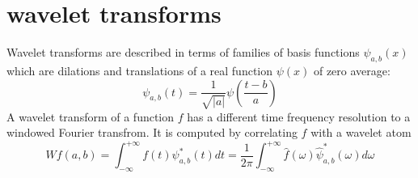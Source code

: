 \section{wavelet transforms}
Wavelet transforms are described in terms of families of basis functions $\psi_{a,b}(x)$ which are dilations and translations of a real function $\psi(x)$ of zero average:
\[ \psi_{a,b}(t)=\frac{1}{\sqrt{|a|}}\psi\left(\frac{t-b}{a}\right) \]
A wavelet transform of a function $f$ has a different time frequency resolution to a windowed Fourier transfrom. It is computed by correlating $f$ with a wavelet atom 
\[Wf(a,b)=\int^{+\infty}_{-\infty}f(t)\psi^{*}_{a,b}(t)dt=\frac{1}{2\pi}\int^{+\infty}_{-\infty} \hat{f}(\omega)\hat{\psi}^{*}_{a,b}(\omega) d\omega \]





%
